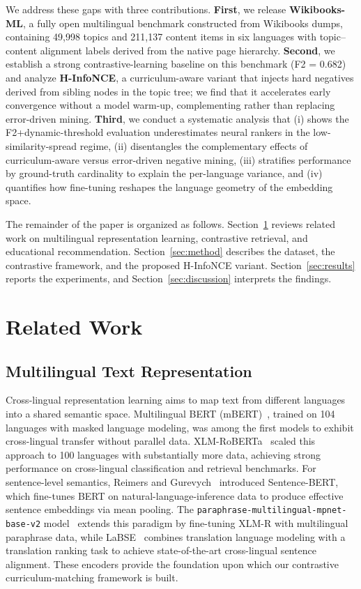 \documentclass[applsci,article,submit,pdftex,moreauthors]{Definitions/mdpi}
\begin{document}
We address these gaps with three contributions. \textbf{First}, we release \textbf{Wikibooks-ML}, a fully open multilingual benchmark constructed from Wikibooks dumps, containing 49,998 topics and 211,137 content items in six languages with topic--content alignment labels derived from the native page hierarchy. \textbf{Second}, we establish a strong contrastive-learning baseline on this benchmark (F2 = 0.682) and analyze \textbf{H-InfoNCE}, a curriculum-aware variant that injects hard negatives derived from sibling nodes in the topic tree; we find that it accelerates early convergence without a model warm-up, complementing rather than replacing error-driven mining. \textbf{Third}, we conduct a systematic analysis that (i) shows the F2+dynamic-threshold evaluation underestimates neural rankers in the low-similarity-spread regime, (ii) disentangles the complementary effects of curriculum-aware versus error-driven negative mining, (iii) stratifies performance by ground-truth cardinality to explain the per-language variance, and (iv) quantifies how fine-tuning reshapes the language geometry of the embedding space.

The remainder of the paper is organized as follows. Section~\ref{sec:related} reviews related work on multilingual representation learning, contrastive retrieval, and educational recommendation. Section~\ref{sec:method} describes the dataset, the contrastive framework, and the proposed H-InfoNCE variant. Section~\ref{sec:results} reports the experiments, and Section~\ref{sec:discussion} interprets the findings.

\section{Related Work}
\label{sec:related}

\subsection{Multilingual Text Representation}

Cross-lingual representation learning aims to map text from different languages into a shared semantic space. Multilingual BERT (mBERT)~\cite{devlin2019bert}, trained on 104 languages with masked language modeling, was among the first models to exhibit cross-lingual transfer without parallel data. XLM-RoBERTa~\cite{conneau2020xlmr} scaled this approach to 100 languages with substantially more data, achieving strong performance on cross-lingual classification and retrieval benchmarks. For sentence-level semantics, Reimers and Gurevych~\cite{reimers2019sbert} introduced Sentence-BERT, which fine-tunes BERT on natural-language-inference data to produce effective sentence embeddings via mean pooling. The \texttt{paraphrase-multilingual-mpnet-base-v2} model~\cite{mpnet} extends this paradigm by fine-tuning XLM-R with multilingual paraphrase data, while LaBSE~\cite{labse} combines translation language modeling with a translation ranking task to achieve state-of-the-art cross-lingual sentence alignment. These encoders provide the foundation upon which our contrastive curriculum-matching framework is built.
\end{document}
